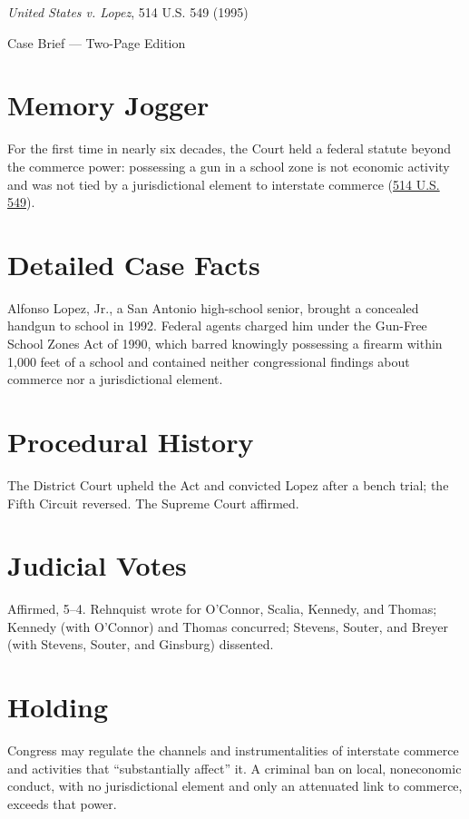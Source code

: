 \documentclass[12pt]{article}
\begin{document}
\begin{center}
{\LARGE \textit{United States v. Lopez}, 514 U.S. 549 (1995)\par}
\vspace{0.5em}
{\large Case Brief --- Two-Page Edition\par}
\end{center}

\section{Memory Jogger}
For the first time in nearly six decades, the Court held a federal statute beyond the commerce power: possessing a gun in a school zone is not economic activity and was not tied by a jurisdictional element to interstate commerce (\href{https://www.courtlistener.com/opinion/117927/united-states-v-lopez/}{514 U.S. 549}).

\section{Detailed Case Facts}
Alfonso Lopez, Jr., a San Antonio high-school senior, brought a concealed handgun to school in 1992. Federal agents charged him under the Gun-Free School Zones Act of 1990, which barred knowingly possessing a firearm within 1,000 feet of a school and contained neither congressional findings about commerce nor a jurisdictional element.

\section{Procedural History}
The District Court upheld the Act and convicted Lopez after a bench trial; the Fifth Circuit reversed. The Supreme Court affirmed.

\section{Judicial Votes}
Affirmed, 5--4. Rehnquist wrote for O'Connor, Scalia, Kennedy, and Thomas; Kennedy (with O'Connor) and Thomas concurred; Stevens, Souter, and Breyer (with Stevens, Souter, and Ginsburg) dissented.

\section{Holding}
Congress may regulate the channels and instrumentalities of interstate commerce and activities that ``substantially affect'' it. A criminal ban on local, noneconomic conduct, with no jurisdictional element and only an attenuated link to commerce, exceeds that power.
\end{document}
